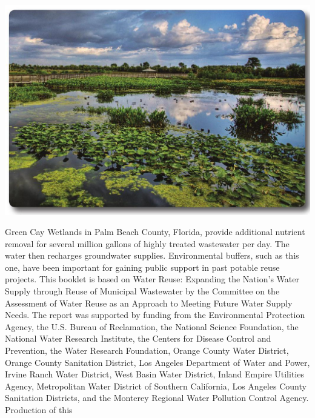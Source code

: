 \documentclass[10pt]{article}
\begin{document}
\includegraphics[max width=\textwidth]{2022_11_05_93277ca2de7ec5580550g-11}

Green Cay Wetlands in Palm Beach County, Florida, provide additional nutrient removal for several million gallons of highly treated wastewater per day. The water then recharges groundwater supplies. Environmental buffers, such as this one, have been important for gaining public support in past potable reuse projects. This booklet is based on Water Reuse: Expanding the Nation's Water Supply through Reuse of Municipal Wastewater by the Committee on the Assessment of Water Reuse as an Approach to Meeting Future Water Supply Needs. The report was supported by funding from the Environmental Protection Agency, the U.S. Bureau of Reclamation, the National Science Foundation, the National Water Research Institute, the Centers for Disease Control and Prevention, the Water Research Foundation, Orange County Water District, Orange County Sanitation District, Los Angeles Department of Water and Power, Irvine Ranch Water District, West Basin Water District, Inland Empire Utilities Agency, Metropolitan Water District of Southern California, Los Angeles County Sanitation Districts, and the Monterey Regional Water Pollution Control Agency. Production of this
\end{document}
